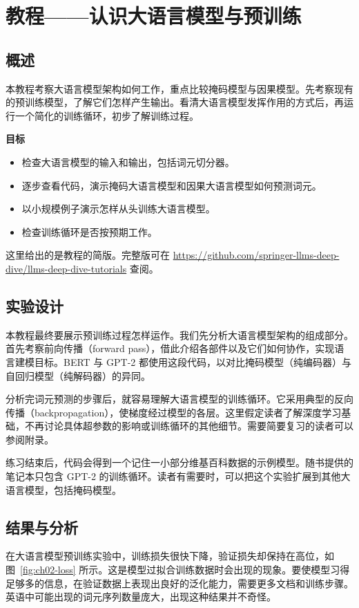 \section[教程：认识大语言模型与预训练]{教程——认识大语言模型与预训练}
\subsection{概述}
本教程考察大语言模型架构如何工作，重点比较掩码模型与因果模型。先考察现有的预训练模型，了解它们怎样产生输出。看清大语言模型发挥作用的方式后，再运行一个简化的训练循环，初步了解训练过程。

\noindent\textbf{目标}
\begin{itemize}
\item 检查大语言模型的输入和输出，包括词元切分器。
\item 逐步查看代码，演示掩码大语言模型和因果大语言模型如何预测词元。
\item 以小规模例子演示怎样从头训练大语言模型。
\item 检查训练循环是否按预期工作。
\end{itemize}
这里给出的是教程的简版。完整版可在 \url{https://github.com/springer-llms-deep-dive/llms-deep-dive-tutorials} 查阅。

\subsection{实验设计}
本教程最终要展示预训练过程怎样运作。我们先分析大语言模型架构的组成部分。首先考察前向传播（forward pass），借此介绍各部件以及它们如何协作，实现语言建模目标。BERT 与 GPT-2 都使用这段代码，以对比掩码模型（纯编码器）与自回归模型（纯解码器）的异同。

分析完词元预测的步骤后，就容易理解大语言模型的训练循环。它采用典型的反向传播（backpropagation），使梯度经过模型的各层。这里假定读者了解深度学习基础，不再讨论具体超参数的影响或训练循环的其他细节。需要简要复习的读者可以参阅附录。

练习结束后，代码会得到一个记住一小部分维基百科数据的示例模型。随书提供的笔记本只包含 GPT-2 的训练循环。读者有需要时，可以把这个实验扩展到其他大语言模型，包括掩码模型。

\subsection{结果与分析}
在大语言模型预训练实验中，训练损失很快下降，验证损失却保持在高位，如图~\ref{fig:ch02-loss} 所示。这是模型过拟合训练数据时会出现的现象。要使模型习得足够多的信息，在验证数据上表现出良好的泛化能力，需要更多文档和训练步骤。英语中可能出现的词元序列数量庞大，出现这种结果并不奇怪。

